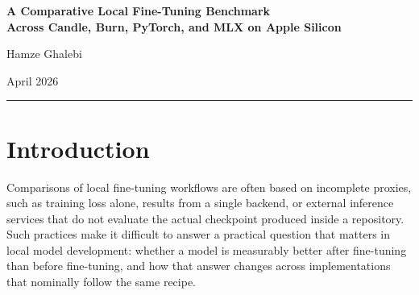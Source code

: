 \documentclass[11pt]{article}
\begin{document}
\begin{center}
{\LARGE\bfseries A Comparative Local Fine-Tuning Benchmark\\[0.25em] Across Candle, Burn, PyTorch, and MLX on Apple Silicon\par}
\vspace{0.9em}
{\large Hamze Ghalebi\par}
{\normalsize April 2026\par}
\end{center}

\vspace{0.4em}
\hrule
\vspace{0.9em}

\begin{abstract}
This paper presents a reproducible local benchmark for supervised fine-tuning across four training backends: Candle, Burn, PyTorch, and MLX. The benchmark addresses a deliberately narrow engineering question: under a fixed dataset split, a fixed held-out evaluation slice, and a fixed small-model training recipe, how do the backends differ in post-fine-tuning quality, training wall time, and inference latency? Each backend saves a persisted base checkpoint, fine-tunes from that checkpoint, reevaluates both the base and fine-tuned checkpoints on the same held-out examples, and emits results in a common JSON schema. On the reported runs, all four backends increase ROUGE-L on the 20-example held-out slice. MLX records the largest absolute ROUGE-L improvement (0.1232), the shortest training wall time (6.29~s), and the lowest fine-tuned latency (22.86~ms). These findings are descriptive rather than inferential: they characterize one controlled benchmark on one Apple Silicon system and should not be generalized beyond this configuration without further replication.
\end{abstract}

\section{Introduction}

Comparisons of local fine-tuning workflows are often based on incomplete proxies, such as training loss alone, results from a single backend, or external inference services that do not evaluate the actual checkpoint produced inside a repository. Such practices make it difficult to answer a practical question that matters in local model development: whether a model is measurably better after fine-tuning than before fine-tuning, and how that answer changes across implementations that nominally follow the same recipe.
\end{document}
